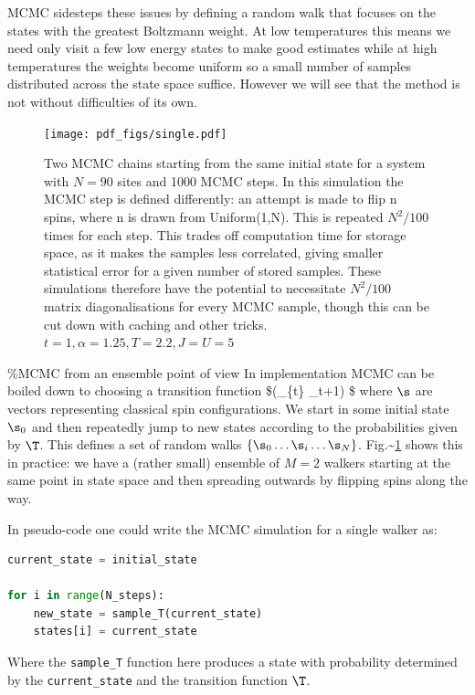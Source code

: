 \ac{MCMC} sidesteps these issues by defining a random walk that focuses on the states with the greatest Boltzmann weight. At low temperatures this means we need only visit a few low energy states to make good estimates while at high temperatures the weights become uniform so a small number of samples distributed across the state space suffice. However we will see that the method is not without difficulties of its own.

\begin{figure}
  \centering
  \texttt{[image: pdf\_figs/single.pdf]}
  \caption{Two MCMC chains starting from the same initial state for a system with $N = 90$ sites and 1000 MCMC steps.  In this simulation the MCMC step is defined differently: an attempt is made to flip n spins, where n is drawn from Uniform(1,N). This is repeated $N^2/100$ times for each step. This trades off computation time for storage space, as it makes the samples less correlated, giving smaller statistical error for a given number of stored samples. These simulations therefore have the potential to necessitate $N^2/100$ matrix diagonalisations for every MCMC sample, though this can be cut down with caching and other tricks. $t = 1, \alpha = 1.25, T = 2.2, J = U = 5 $ \label{fig:single}}
\end{figure}

\%MCMC from an ensemble point of view In implementation \ac{MCMC} can be boiled down to choosing a transition function \$\T(\s\_\{t\} \rightarrow \s\_t+1) \$ where \(\s\) are vectors representing classical spin configurations. We start in some initial state \(\s_0\) and then repeatedly jump to new states according to the probabilities given by \(\T\). This defines a set of random walks \(\{\s_0\ldots \s_i\ldots \s_N\}\). Fig.\textasciitilde{}\ref{fig:single} shows this in practice: we have a (rather small) ensemble of \(M = 2\) walkers starting at the same point in state space and then spreading outwards by flipping spins along the way.

In pseudo-code one could write the MCMC simulation for a single walker as:

\begin{lstlisting}[language=Python]
current_state = initial_state

for i in range(N_steps):
    new_state = sample_T(current_state) 
    states[i] = current_state
\end{lstlisting}

Where the \texttt{sample\_T} function here produces a state with probability determined by the \texttt{current\_state} and the transition function \(\T\).

